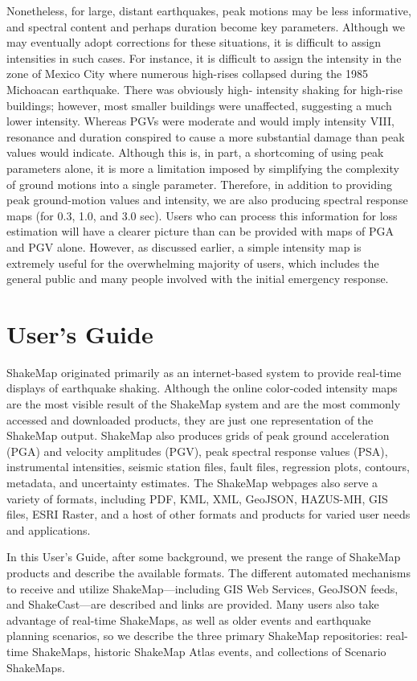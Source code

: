 \documentclass[letterpaper,10pt,english]{sphinxmanual}
\begin{document}
Nonetheless, for large, distant earthquakes, peak motions may be less informative, and
spectral content and perhaps duration become key parameters.  Although we may eventually
adopt corrections for these situations, it is difficult to assign intensities in such cases. For
instance, it is difficult to assign the intensity in the zone of Mexico City where numerous
high-rises collapsed during the 1985 Michoacan earthquake. There was obviously high-
intensity shaking for high-rise buildings; however, most smaller buildings were
unaffected, suggesting a much lower intensity.  Whereas PGVs were
moderate and would imply intensity VIII, resonance and duration conspired to cause a
more substantial damage than peak values would indicate. Although this is, in part, a
shortcoming of using peak parameters alone, it is more a limitation imposed by
simplifying the complexity of ground motions into a single parameter. Therefore, in
addition to providing peak ground-motion values and intensity, we are also producing
spectral response maps (for 0.3, 1.0, and 3.0 sec). Users who can process this information
for loss estimation will have a clearer picture than can be provided with maps of PGA
and PGV alone. However, as discussed earlier, a simple intensity map is extremely useful
for the overwhelming majority of users, which includes the general public and many
people involved with the initial emergency response.


\chapter{User's Guide}
\label{users_guide::doc}\label{users_guide:users-guide}\label{users_guide:user-s-guide}
ShakeMap originated primarily as an internet-based system to provide
real-time displays of earthquake shaking.
Although the online color-coded intensity maps are the most visible result of
the ShakeMap system and are the most commonly accessed and downloaded
products, they are just one representation of the ShakeMap output. ShakeMap also
produces grids of peak ground acceleration (PGA) and velocity
amplitudes (PGV), peak
spectral response values (PSA), instrumental intensities, seismic station files, fault
files, regression plots, contours, metadata, and uncertainty
estimates. The ShakeMap webpages also serve a variety of formats, including
PDF, KML, XML, GeoJSON, HAZUS-MH, GIS files, ESRI Raster, and a host of other
formats and products for varied user needs and applications.

In this User's Guide, after some background, we present the range of ShakeMap
products and describe the available formats. The different automated mechanisms
to receive and utilize ShakeMap---including GIS Web Services, GeoJSON feeds,
and ShakeCast---are described and links are provided. Many users also
take advantage of real-time ShakeMaps, as well as older events and earthquake
planning scenarios, so we describe the three primary ShakeMap repositories:
real-time ShakeMaps, historic ShakeMap Atlas events, and collections of
Scenario ShakeMaps.
\end{document}
